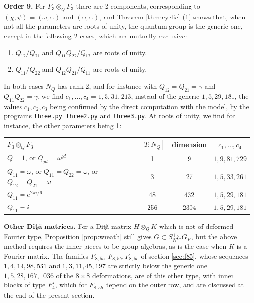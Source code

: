 \documentclass[11pt]{amsart}
\begin{document}
\noindent\textbf{Order 9.} For $F_3\otimes_QF_3$ there are 2 components, corresponding to $(\chi,\psi)=(\omega,\omega)$ and $(\omega,\bar{\omega})$, and Theorem \ref{thm:cyclic} (1) shows that, when not all the parameters are roots of unity, the quantum group is the generic one, except in the following 2 cases, which are mutually exclusive:
\begin{enumerate}
\item $Q_{12}/Q_{21}$ and $Q_{11}Q_{22}/Q_{12}$ are roots of unity.

\item $Q_{11}/Q_{22}$ and $Q_{12}Q_{21}/Q_{11}$ are roots of unity.
\end{enumerate}
In both cases $N_Q$ has rank 2, and for instance with $Q_{12}=Q_{21}=\gamma$ and $Q_{11}Q_{22}=\gamma$, we find $c_1,\ldots,c_4=1,5,31,213$, instead of the generic $1,5,29,181$, the values $c_1,c_2,c_3$ being confirmed by the direct computation with the model, by the programs \texttt{three.py}, \texttt{three2.py} and \texttt{three3.py}. At roots of unity, we find for instance, the other parameters being 1:

\medskip

\begin{center}
\begin{tabular}{lccc}
\toprule
$F_3\otimes_QF_3$ & $[T:N_Q]$ & dimension & $c_1,\ldots,c_4$\\
\midrule
$Q=1$, or $Q_{jd}=\omega^{jd}$ & 1 & 9 & $1,9,81,729$\\
$Q_{11}=\omega$, or $Q_{11}=Q_{22}=\omega$, or $Q_{12}=Q_{21}=\omega$ & 3 & 27 & $1,5,33,261$\\
$Q_{11}=e^{2\pi i/6}$ & 48 & 432 & $1,5,29,181$\\
$Q_{11}=i$ & 256 & 2304 & $1,5,29,181$\\
\bottomrule
\end{tabular}
\end{center}

\medskip

\noindent\textbf{Other Di\c t\u a matrices.} For a Di\c t\u a matrix $H\otimes_QK$ which is not of deformed Fourier type, Proposition \ref{prop:wreath} still gives $G\subset S_N^+\wr_*G_H$, but the above method requires the inner pieces to be group algebras, as is the case when $K$ is a Fourier matrix. The families $F_{8,5a},F_{8,5b},F_{8,5c}$ of section \ref{sec:f85}, whose sequences $1,4,19,98,531$ and $1,3,11,45,197$ are strictly below the generic one $1,5,28,167,1036$ of the $8\times8$ deformations, are of this other type, with inner blocks of type $F_4^s$, which for $F_{8,5b}$ depend on the outer row, and are discussed at the end of the present section.
\end{document}
